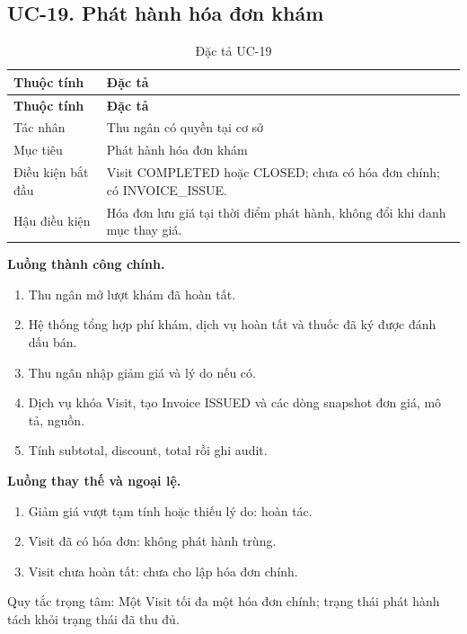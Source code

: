 \clearpage

\subsection{UC-19.\allowbreak{} Phát hành hóa đơn khám}
\label{uc:19}

{\small\setlength{\tabcolsep}{3pt}\renewcommand{\arraystretch}{1.12}
\begin{longtable}{@{}L{\textwidth-1.32pt\relax} L{\textwidth-4.68pt\relax}@{}}
\caption{Đặc tả UC-19}\\
\toprule
\textbf{Thuộc tính} & \textbf{Đặc tả}\\\midrule
\endfirsthead
\toprule
\textbf{Thuộc tính} & \textbf{Đặc tả}\\\midrule
\endhead
\bottomrule\endlastfoot
Tác nhân & Thu ngân có quyền tại cơ sở\\[3pt]
Mục tiêu & Phát hành hóa đơn khám\\[3pt]
Điều kiện bắt đầu & Visit COMPLETED hoặc CLOSED; chưa có hóa đơn chính; có INVOICE\_\allowbreak{}ISSUE.\allowbreak{}\\[3pt]
Hậu điều kiện & Hóa đơn lưu giá tại thời điểm phát hành, không đổi khi danh mục thay giá.\allowbreak{}\\[3pt]
\end{longtable}}
\noindent\textbf{Luồng thành công chính.}
\begin{enumerate}
\item Thu ngân mở lượt khám đã hoàn tất.\allowbreak{}
\item Hệ thống tổng hợp phí khám, dịch vụ hoàn tất và thuốc đã ký được đánh dấu bán.\allowbreak{}
\item Thu ngân nhập giảm giá và lý do nếu có.\allowbreak{}
\item Dịch vụ khóa Visit, tạo Invoice ISSUED và các dòng snapshot đơn giá, mô tả, nguồn.\allowbreak{}
\item Tính subtotal, discount, total rồi ghi audit.\allowbreak{}
\end{enumerate}
\noindent\textbf{Luồng thay thế và ngoại lệ.}
\begin{enumerate}
\item Giảm giá vượt tạm tính hoặc thiếu lý do:\allowbreak{} hoàn tác.\allowbreak{}
\item Visit đã có hóa đơn:\allowbreak{} không phát hành trùng.\allowbreak{}
\item Visit chưa hoàn tất:\allowbreak{} chưa cho lập hóa đơn chính.\allowbreak{}
\end{enumerate}
Quy tắc trọng tâm:\allowbreak{} Một Visit tối đa một hóa đơn chính; trạng thái phát hành tách khỏi trạng thái đã thu đủ.\allowbreak{}


